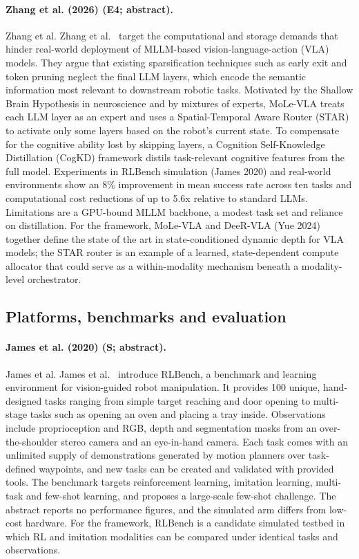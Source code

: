 \documentclass[10pt,a4paper]{article}
\begin{document}
\paragraph{Zhang et al. (2026) (E4; abstract).} Zhang et al. Zhang et al.~\cite{Zhang2026b} target the computational and storage demands that hinder real-world deployment of MLLM-based vision-language-action (VLA) models. They argue that existing sparsification techniques such as early exit and token pruning neglect the final LLM layers, which encode the semantic information most relevant to downstream robotic tasks. Motivated by the Shallow Brain Hypothesis in neuroscience and by mixtures of experts, MoLe-VLA treats each LLM layer as an expert and uses a Spatial-Temporal Aware Router (STAR) to activate only some layers based on the robot's current state. To compensate for the cognitive ability lost by skipping layers, a Cognition Self-Knowledge Distillation (CogKD) framework distils task-relevant cognitive features from the full model. Experiments in RLBench simulation (James 2020) and real-world environments show an 8\% improvement in mean success rate across ten tasks and computational cost reductions of up to 5.6x relative to standard LLMs. Limitations are a GPU-bound MLLM backbone, a modest task set and reliance on distillation. For the framework, MoLe-VLA and DeeR-VLA (Yue 2024) together define the state of the art in state-conditioned dynamic depth for VLA models; the STAR router is an example of a learned, state-dependent compute allocator that could serve as a within-modality mechanism beneath a modality-level orchestrator.

\subsection*{Platforms, benchmarks and evaluation}
\paragraph{James et al. (2020) (S; abstract).} James et al. James et al.~\cite{James2020} introduce RLBench, a benchmark and learning environment for vision-guided robot manipulation. It provides 100 unique, hand-designed tasks ranging from simple target reaching and door opening to multi-stage tasks such as opening an oven and placing a tray inside. Observations include proprioception and RGB, depth and segmentation masks from an over-the-shoulder stereo camera and an eye-in-hand camera. Each task comes with an unlimited supply of demonstrations generated by motion planners over task-defined waypoints, and new tasks can be created and validated with provided tools. The benchmark targets reinforcement learning, imitation learning, multi-task and few-shot learning, and proposes a large-scale few-shot challenge. The abstract reports no performance figures, and the simulated arm differs from low-cost hardware. For the framework, RLBench is a candidate simulated testbed in which RL and imitation modalities can be compared under identical tasks and observations.
\end{document}
